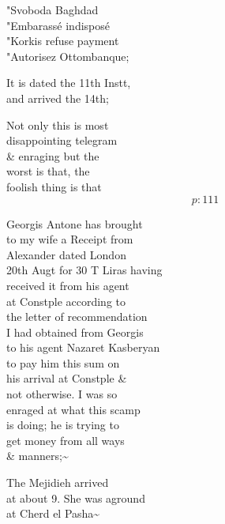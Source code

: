 \documentclass{report}
\begin{document}
	\par{
 	"Svoboda Baghdad\ \\"Embarassé indisposé\ \\"Korkis refuse payment\ \\"Autorisez Ottombanque;\ \\
	}

	\par{
 	It is dated the 11th Instt,\ \\and arrived the 14th;\ \\
	}

	\par{
 	Not only this is most\ \\disappointing telegram\ \\\& enraging but the\ \\worst is that, the\ \\foolish thing is that\ \\
  \[p: 111 \]

	}





	\par{
 	Georgis Antone has brought\ \\to my wife a Receipt from\ \\Alexander dated London\ \\20th Augt for 30 T Liras having\ \\received it from his agent\ \\at Constple according to\ \\the letter of recommendation\ \\I had obtained from Georgis\ \\to his agent Nazaret Kasberyan\ \\to pay him this sum on\ \\his arrival at Constple \&\ \\not otherwise. I was so\ \\enraged at what this scamp\ \\is doing; he is trying to\ \\get money from all ways\ \\\& manners;\~{}\ \\
	}

	\par{
 	The Mejidieh arrived\ \\at about 9. She was aground\ \\at Cherd el Pasha\~{}\ \\
	}
\end{document}
